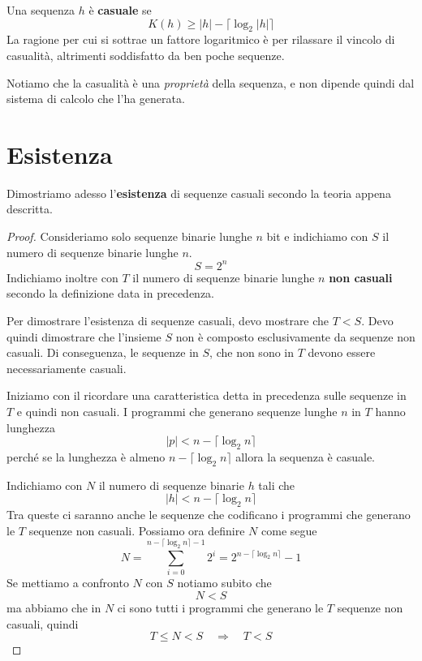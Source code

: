 \begin{definition}
	Una sequenza $h$ \`e \textbf{casuale} se
	\[ K(h) \geq |h| - \lceil \log_2 |h| \rceil \]
	La ragione per cui si sottrae un fattore logaritmico \`e per rilassare il vincolo di casualit\`a, altrimenti
	soddisfatto da ben poche sequenze.
\end{definition}

Notiamo che la casualit\`a \`e una \emph{propriet\`a} della sequenza, e non dipende quindi dal sistema di calcolo
che l'ha generata.

\section{Esistenza}\label{esistenza_casualita}
Dimostriamo adesso l'\textbf{esistenza} di sequenze casuali secondo la teoria appena descritta.

\begin{proof}
	Consideriamo solo sequenze binarie lunghe $n$ bit e indichiamo con $S$ il numero di sequenze binarie lunghe $n$.
	\[ S = 2^n \]
	Indichiamo inoltre con $T$ il numero di sequenze binarie lunghe $n$ \textbf{non casuali} secondo la definizione data
	in precedenza.

	Per dimostrare l'esistenza di sequenze casuali, devo mostrare che $T < S$. Devo quindi dimostrare che l'insieme $S$
	non \`e composto esclusivamente da sequenze non casuali. Di conseguenza, le sequenze in $S$, che non sono in $T$
	devono essere necessariamente casuali.

	Iniziamo con il ricordare una caratteristica detta in precedenza sulle sequenze in $T$ e quindi non casuali. I
	programmi che generano sequenze lunghe $n$ in $T$ hanno lunghezza
	\[ |p| < n - \lceil \log_2 n \rceil \]
	perch\'e se la lunghezza \`e almeno $n - \lceil \log_2 n \rceil$ allora la sequenza \`e casuale.

	Indichiamo con $N$ il numero di sequenze binarie $h$ tali che
	\[ |h| < n - \lceil \log_2 n \rceil \]
	Tra queste ci saranno anche le sequenze che codificano i programmi che generano le $T$ sequenze non casuali. Possiamo
	ora definire $N$ come segue
	\[ N = \sum_{i=0}^{n - \lceil \log_2 n \rceil - 1} 2^i = 2^{n - \lceil \log_2 n \rceil} - 1 \]
	Se mettiamo a confronto $N$ con $S$ notiamo subito che
	\[ N < S \]
	ma abbiamo che in $N$ ci sono tutti i programmi che generano le $T$ sequenze non casuali, quindi
	\[ T \leq N < S \quad \Rightarrow \quad T < S \]
\end{proof}

